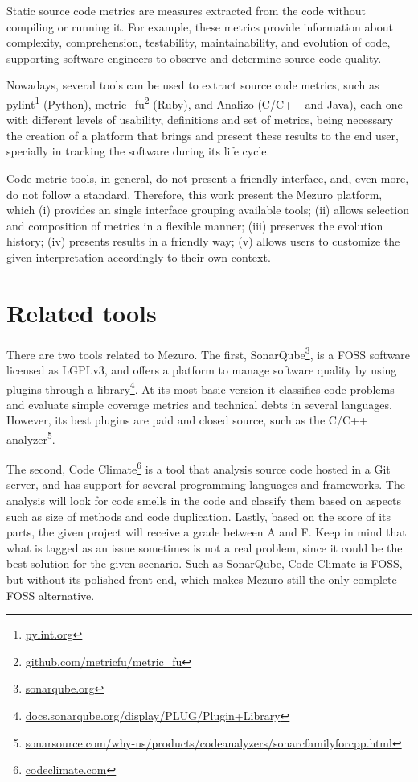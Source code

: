 \documentclass{llncs}
\begin{document}
Static source code metrics are measures extracted from the code without
compiling or running it. For example, these metrics provide information about
complexity, comprehension, testability, maintainability, and evolution of code,
supporting software engineers to observe and determine source code
quality\cite{mills1988}.

Nowadays, several tools can be used to extract source code metrics, such as
pylint\footnote{\url{pylint.org}} (Python),
metric\_fu\footnote{\url{github.com/metricfu/metric_fu}} (Ruby), and
Analizo (C/C++ and Java)\cite{terceiro2010analizo}, each one with different
levels of usability, definitions and set of metrics, being necessary the
creation of a platform that brings and present these results to the end user,
specially in tracking the software during its life cycle.

Code metric tools, in general, do not present a friendly interface, and,
even more, do not follow a standard. Therefore, this work present the
Mezuro platform, which (i) provides an single interface grouping available tools;
(ii) allows selection and composition of metrics in a flexible manner;
(iii) preserves the evolution history;
(iv) presents results in a friendly way;
(v) allows users to customize the given interpretation accordingly to their own context.

\section{Related tools}

There are two tools related to Mezuro. The first,
SonarQube\footnote{\url{sonarqube.org}}, is a FOSS software
licensed as LGPLv3, and offers a platform to manage software quality by using
plugins through a
library\footnote{\url{docs.sonarqube.org/display/PLUG/Plugin+Library}}.
At its most basic version it classifies code problems and evaluate simple
coverage metrics and technical debts in several languages. However, its best
plugins are paid and closed source, such as the C/C++
analyzer\footnote{\url{sonarsource.com/why-us/products/codeanalyzers/sonarcfamilyforcpp.html}}.

The second, Code Climate\footnote{\url{codeclimate.com}} is a tool
that analysis source code hosted in a Git server, and has support for several
programming languages and frameworks. The analysis will look for code smells
in the code and classify them based on aspects such as size of methods and
code duplication. Lastly, based on the score of its parts, the given project
will receive a grade between A and F. Keep in mind that what is tagged as an
issue sometimes is not a real problem, since it could be the best solution for
the given scenario. Such as SonarQube, Code Climate is FOSS, but without its
polished front-end, which makes Mezuro still the only complete FOSS alternative.
\end{document}
